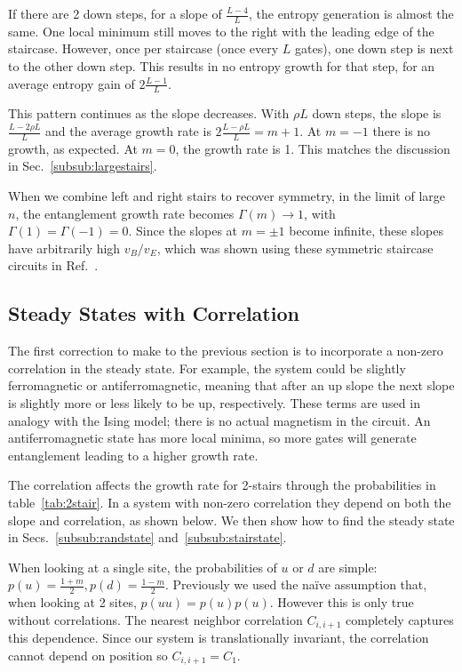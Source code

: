 If there are 2 down steps, for a slope of $\frac{L-4}{L}$, the entropy generation is almost the same. One local minimum still moves to the right with the leading edge of the staircase. However, once per staircase (once every $L$ gates), one down step is next to the other down step. This results in no entropy growth for that step, for an average entropy gain of $2\frac{L-1}{L}$.

This pattern continues as the slope decreases. With $\rho L$ down steps, the slope is $\frac{L-2\rho L}{L}$ and the average growth rate is $2\frac{L-\rho L}{L} = m+1$. At $m = -1$ there is no growth, as expected. At $m=0$, the growth rate is 1. This matches the discussion in Sec.~\ref{subsub:largestairs}.

When we combine left and right stairs to recover symmetry, in the limit of large $n$, the entanglement growth rate becomes $\Gamma(m)\to 1$, with $\Gamma(1) = \Gamma(-1)=0$. Since the slopes at $m=\pm1$ become infinite, these slopes have arbitrarily high $v_B/v_E$, which was shown using these symmetric staircase circuits in Ref.~\cite{Nahum2018}.

\subsection{Steady States with Correlation} \label{sub:steadystate}

The first correction to make to the previous section is to incorporate a non-zero correlation in the steady state. For example, the system could be slightly ferromagnetic or antiferromagnetic, meaning that after an up slope the next slope is slightly more or less likely to be up, respectively. These terms are used in analogy with the Ising model; there is no actual magnetism in the circuit. An antiferromagnetic state has more local minima, so more gates will generate entanglement leading to a higher growth rate.

The correlation affects the growth rate for 2-stairs through the probabilities in table~\ref{tab:2stair}. In a system with non-zero correlation they depend on both the slope and correlation, as shown below. We then show how to find the steady state in Secs.~\ref{subsub:randstate} and~\ref{subsub:stairstate}.

When looking at a single site, the probabilities of $u$ or $d$ are simple: $p(u) = \frac{1+m}{2}, p(d) = \frac{1-m}{2}$. Previously we used the na\"ive assumption that, when looking at 2 sites, $p(uu) = p(u)p(u)$. However this is only true without correlations. The nearest neighbor correlation $C_{i,i+1}$ completely captures this dependence. Since our system is translationally invariant, the correlation cannot depend on position so $C_{i,i+1}=C_1$.

